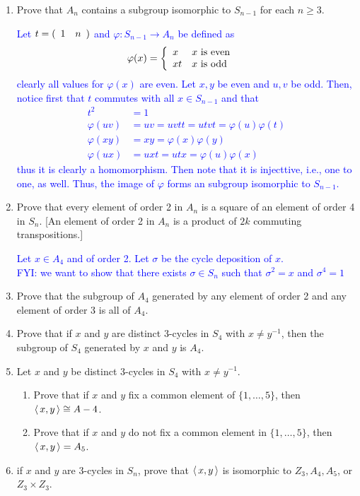 \documentclass[10pt,a4paper]{report}
\newcommand{\BLUE}[1]{\textcolor{blue}{#1}}
\begin{document}
\begin{enumerate}
\item Prove that $A_n$ contains a subgroup isomorphic to $S_{n-1}$ for each $n\ge 3$.

\BLUE{Let $t= (\begin{array}{cccccccccc} 1 & n \end{array})$ and $\varphi : S_{n-1} \to A_n$ be defined as 
\begin{align*}
	\varphi(x) &= \left \{ \begin{array}{ll} x & x \text{ is even}\\ xt & x \text{ is odd}  \end{array} \right .
\end{align*}clearly all values for $\varphi(x)$ are even.  Let $x, y$ be even and $u, v$ be odd.  Then, notice first that $t$ commutes with all $x \in S_{n-1}$ and that
\begin{align*}
	t^2 &= 1 \\
	\varphi(uv) &= uv = uvtt = utvt = \varphi(u)\varphi(t) \\
	\varphi(xy) &= xy = \varphi(x)\varphi(y) \\
	\varphi(ux) &= uxt = utx = \varphi(u)\varphi(x)
\end{align*}thus it is clearly a homomorphism.  Then note that it is injecttive, i.e., one to one, as well.  Thus, the image of $\varphi$ forms an subgroup isomorphic to $S_{n-1}$.
}

\item Prove that every element of order 2 in $A_n$ is a square of an element of order 4 in $S_n$. [An element of order 2 in $A_n$ is a product of $2k$ commuting transpositions.]

\BLUE{Let $x \in A_4$ and of order 2.  Let $\sigma$ be the cycle deposition of $x$. \\
FYI: we want to show that there exists $\sigma \in S_n$ such that $\sigma^2=x$ and $\sigma^4=1$
}

\item Prove that the subgroup of $A_4$ generated by any element of order 2 and any element of order 3 is all of $A_4$.

\item Prove that if $x$ and $y$ are distinct 3-cycles in $S_4$ with $x \ne y^{-1}$, then the subgroup of $S_4$ generated by $x$ and $y$ is $A_4$.

\item Let $x$ and $y$ be distinct 3-cycles in $S_4$ with $x\ne y^{-1}$.
\begin{enumerate}
	\item Prove that if $x$ and $y$ fix a common element of $\{1,\dots,5\}$, then $\left \langle\, x,y \,\right \rangle \cong A-4$.
	
	\item Prove that if $x$ and $y$ do not fix a common element in $\{1,\dots,5\}$, then 	$\left \langle\, x,y \,\right \rangle=A_5$.
\end{enumerate}

\item if $x$ and $y$ are 3-cycles in $S_n$, prove that $\left \langle\, x,y \,\right \rangle$ is isomorphic to $Z_3, A_4, A_5$, or $Z_3\times Z_3$.
\end{enumerate}
\end{document}
